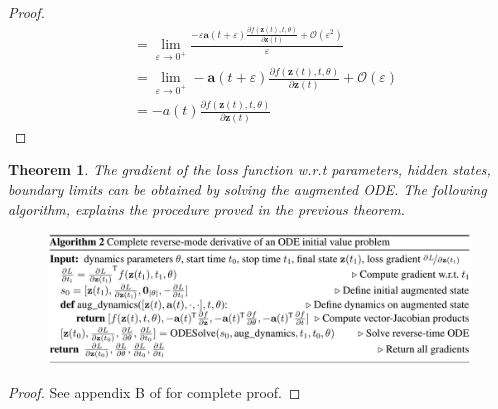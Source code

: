 \documentclass{article}
\newtheorem{theorem}{Theorem}
\begin{document}
\begin{proof}
\begin{equation*}
\begin{aligned}
		&= \lim _ { \varepsilon \rightarrow 0 ^ { + } } \frac { - \varepsilon \mathbf { a } ( t + \varepsilon ) \frac { \partial f ( \mathbf { z } ( t ) , t , \theta ) } { \partial \mathbf { z } ( t ) } + \mathcal { O } \left( \varepsilon ^ { 2 } \right) } { \varepsilon } \\ 
		&= \lim _ { \varepsilon \rightarrow 0 ^ { + } } - \mathbf { a } ( t + \varepsilon ) \frac { \partial f ( \mathbf { z } ( t ) , t , \theta ) } { \partial \mathbf { z } ( t ) } + \mathcal { O } ( \varepsilon ) \\ &= - a ( t ) \frac { \partial f ( \mathbf { z } ( t ) , t , \theta ) } { \partial \mathbf { z } ( t ) }
		\end{aligned}
		\end{equation*}
	\end{proof}
	\begin{theorem}
		The gradient of the loss function w.r.t parameters, hidden states, boundary limits can be obtained by solving the augmented ODE. The following algorithm, explains the procedure proved in the previous theorem.
		\begin{figure}[h!]
			\includegraphics[width=1\linewidth]{images/adjoint-alg}
		\end{figure}
	\end{theorem}
	\begin{proof}
		See appendix B of \cite{chen2018neural} for complete proof.
	\end{proof}
\end{document}
